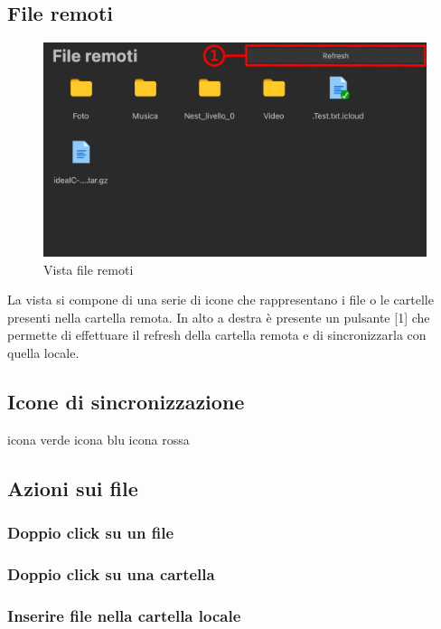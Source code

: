 \subsection{File remoti}
\label{sec:fileRemoti}
\begin{figure}[H]
    \centering
    \includegraphics[scale = 0.8]{components/img/fileRem.png}
    \caption{Vista file remoti}
    \label{fig:fileRem}
\end{figure}
La vista si compone di una serie di icone che rappresentano i file o le cartelle presenti nella cartella remota. In alto a destra è presente un pulsante [1] che permette di effettuare il refresh della cartella remota e di sincronizzarla con quella locale.

\subsection{Icone di sincronizzazione}
\label{sec:iconeSync}
icona verde \newline
icona blu \newline
icona rossa \newline

\subsection{Azioni sui file}
\label{sec:fileActions}

\subsubsection*{Doppio click su un file}
\subsubsection*{Doppio click su una cartella}
\subsubsection*{Inserire file nella cartella locale}
